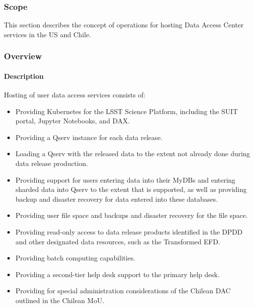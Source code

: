 \subsubsection{Scope}
This section describes the concept of operations for hosting Data Access Center services in the US and Chile.

\subsubsection{Overview}

\paragraph{Description}

Hosting of user data access services consists of:
\begin{itemize}

\item Providing Kubernetes for the LSST Science Platform, including the SUIT portal, Jupyter Notebooks, and DAX.

\item Providing a Qserv instance for each data release.

\item Loading a Qserv with the released data to the extent not already done during data release production.

\item Providing support for users entering data into their MyDBs and entering sharded data into Qserv to the extent that is supported, as well as providing backup and disaster recovery for data entered into these databases.

\item Providing user file space and backups and disaster recovery for the file space.

\item Providing read-only access to data release products identified in the DPDD and other designated data resources, such as the Transformed EFD.

\item Providing batch computing capabilities.

\item Providing a second-tier help desk support to the primary help desk.

\item Providing for special administration considerations of the Chilean DAC outlined in the Chilean MoU.


\end{itemize}
